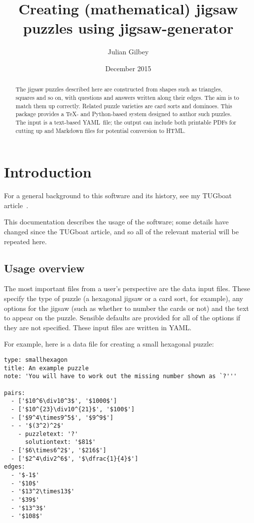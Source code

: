 \documentclass{article}
\def\YAML{{\small YAML}}
\def\PDF{{\small PDF}}
\def\HTML{{\small HTML}}
\def\TUG{{\small TUG}}
\begin{document}
\title{Creating (mathematical) jigsaw puzzles using jigsaw-generator}
\author{Julian Gilbey}
\date{December 2015}
\maketitle

\begin{abstract}
  \noindent
  The jigsaw puzzles described here are constructed from shapes such
  as triangles, squares and so on, with questions and answers written
  along their edges.  The aim is to match them up correctly.  Related
  puzzle varieties are card sorts and dominoes.  This package provides
  a \TeX- and Python-based system designed to author such puzzles.
  The input is a text-based \YAML\ file; the output can include both
  printable \PDF s for cutting up and Markdown files for potential
  conversion to \HTML.
\end{abstract}

\tableofcontents

\section{Introduction}

For a general background to this software and its history, see
my \TUG boat article~\cite{JGtugboat}.

This documentation describes the usage of the software; some details
have changed since the \TUG boat article, and so all of the relevant
material will be repeated here.

\subsection{Usage overview}

The most important files from a user's perspective are the data input
files.  These specify the type of puzzle (a hexagonal jigsaw or a card
sort, for example), any options for the jigsaw (such as whether to
number the cards or not) and the text to appear on the puzzle.
Sensible defaults are provided for all of the options if they are not
specified.  These input files are written in \YAML.

For example, here is a data file for creating a small hexagonal puzzle:

\begin{verbatim}
type: smallhexagon
title: An example puzzle
note: 'You will have to work out the missing number shown as `?'''

pairs:
  - ['$10^6\div10^3$', '$1000$']
  - ['$10^{23}\div10^{21}$', '$100$']
  - ['$9^4\times9^5$', '$9^9$']
  - - '$(3^2)^2$'
    - puzzletext: '?'
      solutiontext: '$81$'
  - ['$6\times6^2$', '$216$']
  - ['$2^4\div2^6$', '$\dfrac{1}{4}$']
edges:
  - '$-1$'
  - '$10$'
  - '$13^2\times13$'
  - '$39$'
  - '$13^3$'
  - '$108$'
\end{verbatim}
\end{document}
